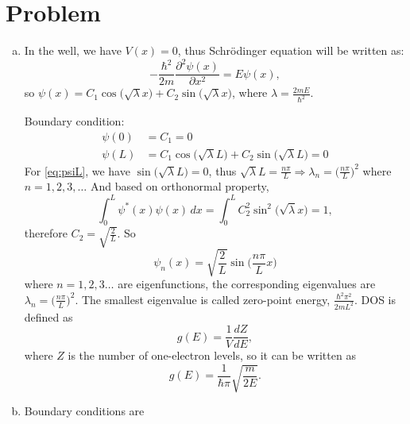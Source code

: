 \documentclass[12pt]{article}
\newcommand*{\RMN}[1]{\uppercase\expandafter{\romannumeral#1}}
\begin{document}
\section*{Problem \RMN{1}}
\begin{enumerate}[(a)]
	\item In the well, we have $V(x) = 0$, thus
	      Schr\"{o}dinger equation will be written as:
	      \begin{equation}
	      	-\frac{\hbar^2}{2m}\dfrac{\partial^2 \psi(x)}{\partial x^2} = E\psi(x),
	      \end{equation}
	      so $\psi(x) = C_1 \cos\big(\sqrt{\lambda}x\big) + C_2 \sin\big(\sqrt{\lambda}x\big)$, where $\lambda=\frac{2mE}{\hbar^2}$.

	      Boundary condition:
	      \begin{align}
	      	\psi(0) & = C_1 = 0                                                                                  \\
	      	\psi(L) & = C_1 \cos\big(\sqrt{\lambda}L\big) + C_2 \sin\big(\sqrt{\lambda}L\big) = 0\label{eq:psiL}
	      \end{align}
	      For \eqref{eq:psiL}, we have $\sin\big(\sqrt{\lambda}L\big) = 0$, thus $\sqrt{\lambda}L = \frac{n\pi}{L} \Rightarrow \lambda_n = \big(\frac{n\pi}{L}\big)^2$ where $n= 1, 2, 3,\ldots$
	      And based on orthonormal property,
	      \begin{equation}
	      	\int_0^L \psi^\ast(x)\psi(x) \, dx = \int_0^L C_2^2 \sin^2\big(\sqrt{\lambda}x\big) = 1,
	      \end{equation}
	      therefore $C_2 = \sqrt{\frac{2}{L}}$.
	      So
	      \begin{equation}
	      	\psi_n(x) =  \sqrt{\frac{2}{L}} \sin\bigg(\frac{n\pi}{L}x\bigg)
	      \end{equation}
	      where $n=  1,  2,  3\ldots$ are eigenfunctions, the corresponding eigenvalues are $\lambda_n = \big(\frac{n\pi}{L}\big)^2$.
	      The smallest eigenvalue is called zero-point energy, $\frac{\hbar^2\pi^2}{2m L^2}$.
	      DOS is defined as
	      \begin{equation}
	      	g(E) = \frac{1}{V}\frac{dZ}{dE},
	      \end{equation}
	      where $Z$ is the number of one-electron levels,
	      so it can be written as
	      \begin{equation}
	      	g(E) = \frac{1}{\hbar\pi}\sqrt{\frac{m}{2E}}.
	      \end{equation}
	\item Boundary conditions are

\end{enumerate}
\end{document}

